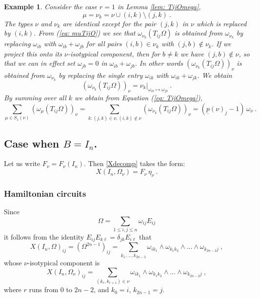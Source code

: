 \documentclass[10pt]{amsart}
\newcommand{\pp}{{\underline{p}}}
\theoremstyle{plain}
\newtheorem{ex}[thm]{Example}
\newcommand{\0}{\color{blue}{\mathsf{0}}}
\begin{document}
\begin{ex}\label{ex: k1TijOmega}
Consider the case $r=1$ in Lemma \ref{lem: TijOmega},
$$
\mu=\nu_k=\nu\cup(i,k)\setminus(j,k)\ .
$$
The types $\nu$ and $\nu_k$ are identical except for the pair $(j,k)$ in $\nu$ which
is replaced by $(i,k)$. From (\ref{eq: muTijO}) we see that $\omega_{\nu_k}(T_{ij}\Omega)$ is obtained from $\omega_{\nu_k}$ by replacing $\omega_{ib}$ with $\omega_{ib}+\omega_{jb}$  for all  pairs $(i,b)\in\nu_k$ with $(j,b)\notin\nu_k$. 
If we project this onto its $\nu$-isotypical component, then for $b\neq k$ we
have $(j,b)\notin \nu$, so that we can in effect set $\omega_{jb}=0$ in $\omega_{ib}+\omega_{jb}$. In other words  $\left(\omega_{\nu_k}(T_{ij}\Omega)\right)_{\nu}$ is obtained from $\omega_{\nu_k}$ by replacing the single entry $\omega_{ik}$  with $\omega_{ik}+\omega_{jk}$.
We obtain 
$$
(\omega_{\nu_k}(T_{ij}\Omega))_\nu=\left.\nu_k\right|_{\omega_{ik}\mapsto\omega_{jk}}\ .
$$
By summing over all $k$ we obtain from Equation (\ref{eq: TijOmega}),
$$
\sum_{\mu \in S_1(\nu)}  (\omega_{\mu} (T_{ij} \Omega))_{\nu} =
\sum_{k:(j,k)\in\nu,(i,k)\notin\nu}  (\omega_{\nu_k} (T_{ij} \Omega))_{\nu} =
(\pp(\nu)_j-1)\, \omega_{\nu} \ .
$$
\end{ex}
\subsection{Case  when \texorpdfstring{$B=I_n$}{B is the identity}.}\label{sect:BIn}
Let us write $F_{\nu}= F_{\nu}(I_n)$. Then \eqref{Xdecomp} takes the form:
\begin{equation}\label{Fij1}
X(I_n,\Omega_\nu)=F_\nu\, \eta_\nu\ . 
\end{equation}
\subsubsection{Hamiltonian circuits}
Since 
\[ \Omega = \sum_{1 \leq i, j \leq n}  \omega_{ij} E_{ij}\]
it follows from the identity $E_{ij} E_{k\ell} = \delta_{jk} E_{i\ell}$ that 
\begin{equation}  \label{XInucycles} X(I_n, \Omega)_{ij} = \left(\Omega^{2n-1} \right)_{ij} = \sum_{k_1,\ldots, k_{2n-2}} \omega_{i k_1} \wedge \omega_{k_1 k_2} \wedge \ldots \wedge \omega_{k_{2n-2} j}  \ ,
\end{equation}
whose $\nu$-isotypical component is
\begin{equation}  \label{XInucycles1}
X(I_n, \Omega_\nu)_{ij} = \sum_{(k_r,k_{r+1})\in\nu}
\omega_{i k_1} \wedge \omega_{k_1 k_2} \wedge \ldots \wedge \omega_{k_{2n-2} j}\ ,
\end{equation}
where $r$ runs from $0$ to $2n-2$, and $k_0=i$, $k_{2n-1}=j$.
\end{document}

